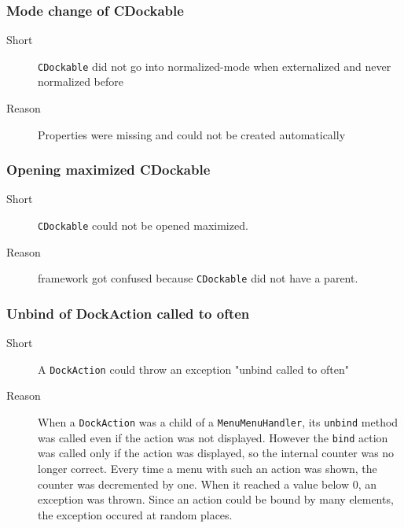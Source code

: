 \documentclass[a4paper,10pt]{article}
\newcommand{\src}[1]{\lstinline[basicstyle=\normalsize\ttfamily,keywordstyle=\normalsize\ttfamily,identifierstyle=\normalsize\ttfamily]|#1|}
\newcommand{\short}{\item[Short]}
\newcommand{\why}{\item[Reason]}
\begin{document}
\subsubsection{Mode change of CDockable}
\begin{description}
 \short \src{CDockable} did not go into normalized-mode when externalized and never normalized before
 \why Properties were missing and could not be created automatically
\end{description}

\subsubsection{Opening maximized CDockable}
\begin{description}
 \short \src{CDockable} could not be opened maximized.
 \why framework got confused because \src{CDockable} did not have a parent.
\end{description}

\subsubsection{Unbind of DockAction called to often}
\begin{description}
 \short A \src{DockAction} could throw an exception "unbind called to often"
 \why When a \src{DockAction} was a child of a \src{MenuMenuHandler}, its \src{unbind} method was called even if the action was not displayed. However the \src{bind} action was called only if the action was displayed, so the internal counter was no longer correct. Every time a menu with such an action was shown, the counter was decremented by one. When it reached a value below 0, an exception was thrown. Since an action could be bound by many elements, the exception occured at random places.
\end{description}
\end{document}

